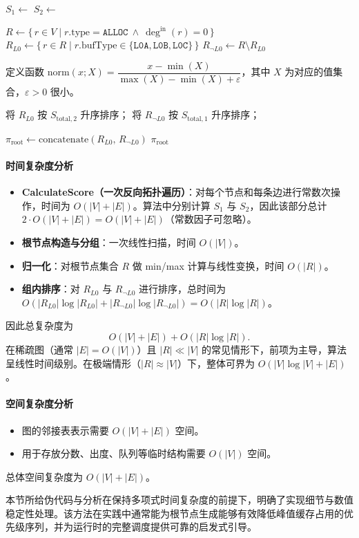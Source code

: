 \begin{algorithm}[H]
$S_1 \leftarrow$ \;
$S_2 \leftarrow$ \;

$R \leftarrow \{\,r\in V \mid r.\text{type}=\texttt{ALLOC} \ \wedge\ \deg^{\mathrm{in}}(r)=0\,\}$\;
$R_{L0} \leftarrow \{\,r\in R \mid r.\text{bufType}\in\{\texttt{L0A},\texttt{L0B},\texttt{L0C}\}\,\}$\;
$R_{\neg L0} \leftarrow R \setminus R_{L0}$\;

定义函数 $\mathrm{norm}(x;X) = \dfrac{x-\min(X)}{\max(X)-\min(X)+\varepsilon}$，其中 $X$ 为对应的值集合，$\varepsilon>0$ 很小。\;


将 $R_{L0}$ 按 $S_{\mathrm{total},2}$ 升序排序；\;
将 $R_{\neg L0}$ 按 $S_{\mathrm{total},1}$ 升序排序；\;

$\pi_{\mathrm{root}} \leftarrow \text{concatenate}(R_{L0},\,R_{\neg L0})$\;
\Return $\pi_{\mathrm{root}}$\;
\end{algorithm}



\paragraph{时间复杂度分析}
\begin{itemize}[noitemsep]
  \item \textbf{CalculateScore（一次反向拓扑遍历）}：对每个节点和每条边进行常数次操作，时间为 $O(|V|+|E|)$。算法中分别计算 $S_1$ 与 $S_2$，因此该部分总计 $2\cdot O(|V|+|E|)=O(|V|+|E|)$（常数因子可忽略）。
  \item \textbf{根节点构造与分组}：一次线性扫描，时间 $O(|V|)$。
  \item \textbf{归一化}：对根节点集合 $R$ 做 min/max 计算与线性变换，时间 $O(|R|)$。
  \item \textbf{组内排序}：对 $R_{L0}$ 与 $R_{\neg L0}$ 进行排序，总时间为 $O(|R_{L0}|\log|R_{L0}|+|R_{\neg L0}|\log|R_{\neg L0}|)=O(|R|\log|R|)$。
\end{itemize}
因此总复杂度为
\[
O(|V|+|E|) + O(|R|\log|R|).
\]
在稀疏图（通常 $|E|=O(|V|)$）且 $|R|\ll |V|$ 的常见情形下，前项为主导，算法呈线性时间级别。在极端情形（$|R|\approx |V|$）下，整体可界为 $O(|V|\log|V| + |E|)$。

\paragraph{空间复杂度分析}
\begin{itemize}[noitemsep]
  \item 图的邻接表表示需要 $O(|V|+|E|)$ 空间。
  \item 用于存放分数、出度、队列等临时结构需要 $O(|V|)$ 空间。
\end{itemize}
总体空间复杂度为 $O(|V|+|E|)$。

本节所给伪代码与分析在保持多项式时间复杂度的前提下，明确了实现细节与数值稳定性处理。该方法在实践中通常能为根节点生成能够有效降低峰值缓存占用的优先级序列，并为运行时的完整调度提供可靠的启发式引导。